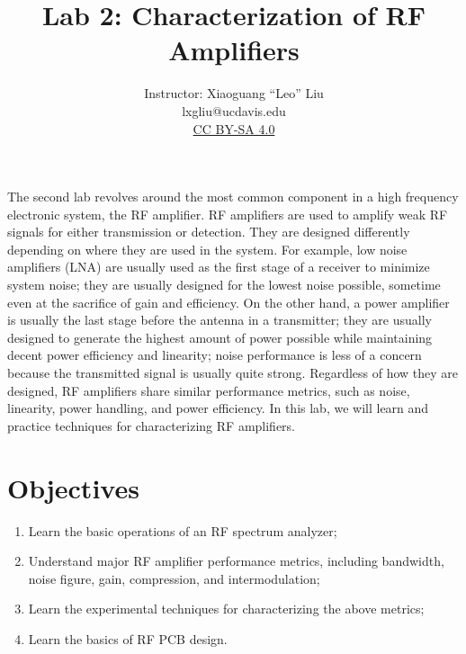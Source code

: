\documentclass[letterpaper, 11pt]{article}
\begin{document}
\title{Lab 2: Characterization of RF Amplifiers}
\author{Instructor: Xiaoguang ``Leo'' Liu\\lxgliu@ucdavis.edu \\
	\small \href{http://creativecommons.org/licenses/by-sa/4.0/}{CC BY-SA 4.0}}
\date{}

\maketitle

The second lab revolves around the most common component in a high frequency electronic system, the RF amplifier. RF amplifiers are used to amplify weak RF signals for either transmission or detection. They are designed differently depending on where they are used in the system. For example, low noise amplifiers (LNA) are usually used as the first stage of a receiver to minimize system noise; they are usually designed for the lowest noise possible, sometime even at the sacrifice of gain and efficiency. On the other hand, a power amplifier is usually the last stage before the antenna in a transmitter; they are usually designed to generate the highest amount of power possible while maintaining decent power efficiency and linearity; noise performance is less of a concern because the transmitted signal is usually quite strong. Regardless of how they are designed, RF amplifiers share similar performance metrics, such as noise, linearity, power handling, and power efficiency. In this lab, we will learn and practice techniques for characterizing RF amplifiers. 

\section{Objectives}

\begin{enumerate}[itemsep=0.1ex]
	\item Learn the basic operations of an RF spectrum analyzer;
	\item Understand major RF amplifier performance metrics, including bandwidth, noise figure, gain, compression, and intermodulation;
	\item Learn the experimental techniques for characterizing the above metrics;
	\item Learn the basics of RF PCB design. 
\end{enumerate}

\end{document}
